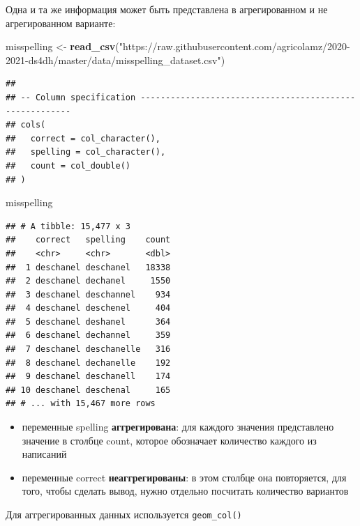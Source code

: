 \documentclass[
]{book}
\newenvironment{Shaded}{\begin{snugshade}}{\end{snugshade}}
\newcommand{\DecValTok}[1]{\textcolor[rgb]{0.00,0.00,0.81}{#1}}
\newcommand{\KeywordTok}[1]{\textcolor[rgb]{0.13,0.29,0.53}{\textbf{#1}}}
\newcommand{\NormalTok}[1]{#1}
\newcommand{\OperatorTok}[1]{\textcolor[rgb]{0.81,0.36,0.00}{\textbf{#1}}}
\newcommand{\StringTok}[1]{\textcolor[rgb]{0.31,0.60,0.02}{#1}}
\providecommand{\tightlist}{%
  \setlength{\itemsep}{0pt}\setlength{\parskip}{0pt}}
\begin{document}
Одна и та же информация может быть представлена в агрегированном и не агрегированном варианте:

\begin{Shaded}
\begin{Highlighting}[]
\NormalTok{misspelling <-}\StringTok{ }\KeywordTok{read_csv}\NormalTok{(}\StringTok{"https://raw.githubusercontent.com/agricolamz/2020-2021-ds4dh/master/data/misspelling_dataset.csv"}\NormalTok{)}
\end{Highlighting}
\end{Shaded}

\begin{verbatim}
## 
## -- Column specification --------------------------------------------------------
## cols(
##   correct = col_character(),
##   spelling = col_character(),
##   count = col_double()
## )
\end{verbatim}

\begin{Shaded}
\begin{Highlighting}[]
\NormalTok{misspelling }
\end{Highlighting}
\end{Shaded}

\begin{verbatim}
## # A tibble: 15,477 x 3
##    correct   spelling    count
##    <chr>     <chr>       <dbl>
##  1 deschanel deschanel   18338
##  2 deschanel dechanel     1550
##  3 deschanel deschannel    934
##  4 deschanel deschenel     404
##  5 deschanel deshanel      364
##  6 deschanel dechannel     359
##  7 deschanel deschanelle   316
##  8 deschanel dechanelle    192
##  9 deschanel deschanell    174
## 10 deschanel deschenal     165
## # ... with 15,467 more rows
\end{verbatim}

\begin{itemize}
\tightlist
\item
  переменные spelling \textbf{аггрегирована}: для каждого значения представлено значение в столбце count, которое обозначает количество каждого из написаний
\item
  переменные correct \textbf{неаггрегированы}: в этом столбце она повторяется, для того, чтобы сделать вывод, нужно отдельно посчитать количество вариантов
\end{itemize}

Для аггрегированных данных используется \texttt{geom\_col()}

\begin{Shaded}
\end{Shaded}
\end{document}
